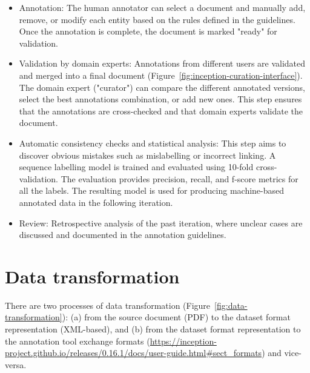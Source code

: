 \begin{itemize}
\item Annotation: The human annotator can select a document and manually add, remove, or modify each entity based on the rules defined in the guidelines. Once the annotation is complete, the document is marked "ready" for validation. 

\item Validation by domain experts: Annotations from different users are validated and merged into a final document (Figure~\ref{fig:inception-curation-interface}). 
The domain expert ("curator") can compare the different annotated versions, select the best annotations combination, or add new ones. 
This step ensures that the annotations are cross-checked and that domain experts validate the document.

\item Automatic consistency checks and statistical analysis: This step aims to discover obvious mistakes such as mislabelling or incorrect linking. 
A sequence labelling model is trained and evaluated using 10-fold cross-validation. The evaluation provides precision, recall, and f-score metrics for all the labels.
The resulting model is used for producing machine-based annotated data in the following iteration.

\item Review: Retrospective analysis of the past iteration, where unclear cases are discussed and documented in the annotation guidelines. 

\end{itemize}

\section{Data transformation}
\label{subsec:transformation-of-data}
There are two processes of data transformation (Figure~\ref{fig:data-transformation}): (a) from the source document (PDF) to the dataset format representation (XML-based), and (b) from the dataset format representation to the annotation tool exchange formats (\url{https://inception-project.github.io/releases/0.16.1/docs/user-guide.html\#sect_formats}) and vice-versa. 


